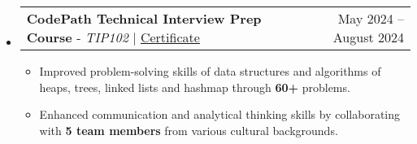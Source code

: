 \documentclass[letterpaper,11pt]{article}
\makeatletter
\newcommand{\resumeItem}[1]{
  \item\small{
    {#1 \vspace{-3pt}}
  }
}
\newcommand{\resumeProjectHeading}[2]{
    \item
    \begin{tabular*}{0.97\textwidth}{l@{\extracolsep{\fill}}r@{\hspace{-0.1in}}}
        \small#1 & \small#2 \\
    \end{tabular*}\vspace{-3pt}
}
\newcommand{\resumeSubHeadingListStart}{\begin{itemize}[leftmargin=0.00in, rightmargin=-0.2in, label={}]}
\newcommand{\resumeSubHeadingListEnd}{\end{itemize}\vspace{-10pt}}
\newcommand{\resumeItemListStart}{\begin{itemize}[leftmargin=0.15in, rightmargin=0.15in]}
\newcommand{\resumeItemListEnd}{\end{itemize}\vspace{-3pt}}
\makeatother
\begin{document}
\resumeSubHeadingListStart
\resumeProjectHeading
{\textbf{CodePath Technical Interview Prep Course} - \emph{TIP102} $|$ \href{https://drive.google.com/file/d/1AF2ZAUXoXeakbAZIJZ_izQ2nd9aNfjYB/view?usp=sharing}{\underline{Certificate}}}{May 2024 -- August 2024}
\resumeItemListStart
\resumeItem{Improved problem-solving skills of data structures and algorithms of heaps, trees, linked lists and hashmap through \textbf{60+} problems.}
\resumeItem{Enhanced communication and analytical thinking skills by collaborating with \textbf{5 team members} from various cultural backgrounds.}
\resumeItemListEnd
\resumeSubHeadingListEnd

\end{document}
